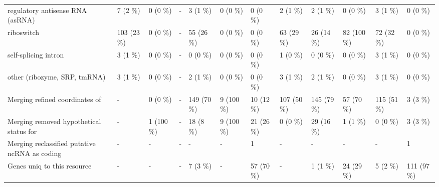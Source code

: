 {\begin{tabular}{llllllllllll}
\hspace{1em}regulatory antisense RNA (asRNA) & 7 (2 \%) & 0 (0 \%) & - & 3 (1 \%) & 0 (0 \%) & 0 (0 \%) & 2 (1 \%) & 2 (1 \%) & 0 (0 \%) & 3 (1 \%) & 0 (0 \%)\\
\hspace{1em}riboswitch & 103 (23 \%) & 0 (0 \%) & - & 55 (26 \%) & 0 (0 \%) & 0 (0 \%) & 63 (29 \%) & 26 (14 \%) & 82 (100 \%) & 72 (32 \%) & 0 (0 \%)\\
\hspace{1em}self-splicing intron & 3 (1 \%) & 0 (0 \%) & - & 0 (0 \%) & 0 (0 \%) & 0 (0 \%) & 1 (0 \%) & 0 (0 \%) & 0 (0 \%) & 3 (1 \%) & 0 (0 \%)\\
\hspace{1em}other (ribozyme, SRP, tmRNA) & 3 (1 \%) & 0 (0 \%) & - & 2 (1 \%) & 0 (0 \%) & 0 (0 \%) & 3 (1 \%) & 2 (1 \%) & 0 (0 \%) & 3 (1 \%) & 0 (0 \%)\\
Merging refined coordinates of & - & 0 (0 \%) & - & 149 (70 \%) & 9 (100 \%) & 10 (12 \%) & 107 (50 \%) & 145 (79 \%) & 57 (70 \%) & 115 (51 \%) & 3 (3 \%)\\
Merging removed hypothetical status for & - & 1 (100 \%) & - & 18 (8 \%) & 9 (100 \%) & 21 (26 \%) & 0 (0 \%) & 29 (16 \%) & 1 (1 \%) & 0 (0 \%) & 3 (3 \%)\\
Merging reclassified putative ncRNA as coding & - & - & - & - & - & 1 & - & - & - & - & 1\\
Genes uniq to this resource & - & - & - & 7 (3 \%) & - & 57 (70 \%) & - & 1 (1 \%) & 24 (29 \%) & 5 (2 \%) & 111 (97 \%)\\
\bottomrule
\end{tabular}}
